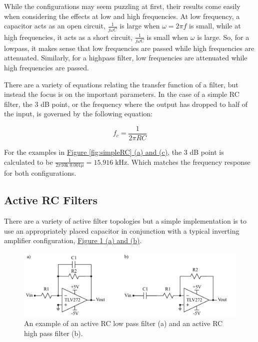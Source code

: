 While the configurations may seem puzzling at first, their results come easily when considering the effects at low and high frequencies. At low frequency, a capacitor acts as an open circuit, $\frac{1}{j\omega C}$ is large when $\omega =2\pi f$ is small, while at high frequencies, it acts as a short circuit, $\frac{1}{j\omega C}$ is small when $\omega$ is large. So, for a lowpass, it makes sense that low frequencies are passed while high frequencies are attenuated. Similarly, for a highpass filter, low frequencies are attenuated while high frequencies are passed. 

There are a variety of equations relating the transfer function of a filter, but instead the focus is on the important parameters. In the case of a simple RC filter, the 3 dB point, or the frequency where the output has dropped to half of the input, is governed by the following equation:

\begin{equation}
f_c = \frac{1}{2 \pi RC}
\end{equation}

\noindent For the examples in \hyperref[fig:simpleRC]{Figure \ref*{fig:simpleRC} (a) and (c)}, the 3 dB point is calculated to be $\frac{1}{2 \pi 10\mathrm{k}\; 0.001\mu} = 15.916\;\mathrm{kHz}$. Which matches the frequency response for both configurations. 

\subsection{Active RC Filters}

There are a variety of active filter topologies but a simple implementation is to use an appropriately placed capacitor in conjunction with a typical inverting amplifier configuration, \hyperref[fig:9activeRC]{Figure \ref*{fig:9activeRC} (a) and (b)}.

\begin{figure}[h]
	\centering
		\includegraphics[width=1\textwidth]{Lab9activeRC.pdf}
	\caption{An example of an active RC low pass filter (a) and an active RC high pass filter (b).} \label{fig:9activeRC}
\end{figure}

